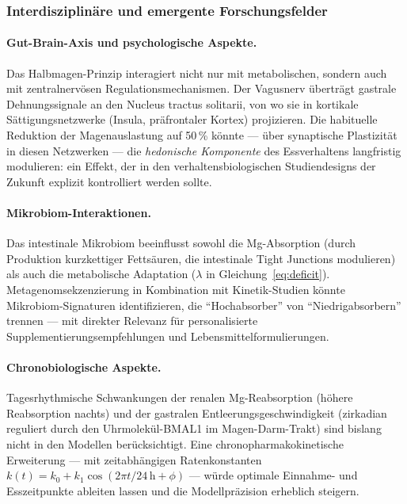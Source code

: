 ﻿\documentclass[12pt,a4paper]{article}
\theoremstyle{plain}
\theoremstyle{definition}
\theoremstyle{remark}
\begin{document}
\subsubsection{Interdisziplinäre und emergente Forschungsfelder}

\paragraph{Gut-Brain-Axis und psychologische Aspekte.}
Das Halbmagen-Prinzip interagiert nicht nur mit metabolischen, sondern
auch mit zentralnervösen Regulationsmechanismen. Der Vagusnerv überträgt
gastrale Dehnungssignale an den Nucleus tractus solitarii, von wo sie
in kortikale Sättigungsnetzwerke (Insula, präfrontaler Kortex) projizieren.
Die habituelle Reduktion der Magenauslastung auf 50\,\% könnte --- über
synaptische Plastizität in diesen Netzwerken --- die \emph{hedonische
Komponente} des Essverhaltens langfristig modulieren: ein Effekt, der
in den verhaltensbiologischen Studiendesigns der Zukunft explizit
kontrolliert werden sollte.

\paragraph{Mikrobiom-Interaktionen.}
Das intestinale Mikrobiom beeinflusst sowohl die Mg-Absorption (durch
Produktion kurzkettiger Fettsäuren, die intestinale Tight Junctions
modulieren) als auch die metabolische Adaptation ($\lambda$ in
Gleichung~\eqref{eq:deficit}). Metagenomsekzenzierung in Kombination
mit Kinetik-Studien könnte Mikrobiom-Signaturen identifizieren, die
``Hochabsorber'' von ``Niedrigabsorbern'' trennen --- mit direkter
Relevanz für personalisierte Supplementierungsempfehlungen und
Lebensmittelformulierungen.

\paragraph{Chronobiologische Aspekte.}
Tagesrhythmische Schwankungen der renalen Mg-Reab\-sor\-ption (höhere
Reabsorption nachts) und der gastralen Entleerungsge\-schwindigkeit
(zirkadian reguliert durch den Uhrmolekül-BMAL1 im Magen-Darm-Trakt)
sind bislang nicht in den Modellen berücksichtigt. Eine
chronopharmakokinetische Erweiterung --- mit zeitabhängigen
Ratenkonstanten $k(t) = k_0 + k_1 \cos(2\pi t / 24\,\text{h} + \phi)$
--- würde optimale Einnahme- und Esszeitpunkte ableiten lassen und
die Modellpräzision erheblich steigern.
\end{document}
